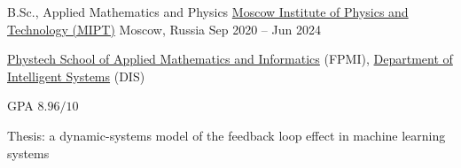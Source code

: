 \begin{cventries}
  \cventry
    {B.Sc., Applied Mathematics and Physics} %
    {\href{https://en.wikipedia.org/wiki/Moscow_Institute_of_Physics_and_Technology}{Moscow Institute of Physics and Technology (MIPT)}} %
    {Moscow, Russia} %
    {Sep 2020 -- Jun 2024} %
    {
      \begin{cvitems}
        \item {\href{https://pk.mipt.ru/schools/fpmi/}{Phystech School of Applied Mathematics and Informatics} (FPMI), \href{https://intsystems.github.io}{Department of Intelligent Systems} (DIS)}
        \item {GPA $8.96/10$}
        \item {Thesis: a dynamic-systems model of the feedback loop effect in machine learning systems}
      \end{cvitems}
    }

\end{cventries}
